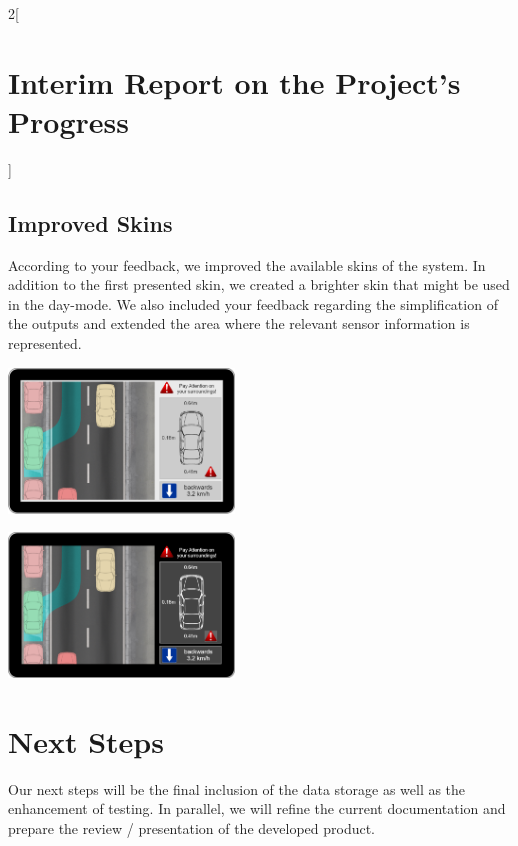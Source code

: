 \documentclass[12pt, a4paper, oneside, british]{report}
\begin{document}
\begin{multicols}{2}[\section{Interim Report on the Project's Progress}]
\subsection{Improved Skins}
According to your feedback, we improved the available skins of the system. In addition to the first presented skin, we created a brighter skin that might be used in the day-mode. We also included your feedback regarding the simplification of the outputs and extended the area where the relevant sensor information is represented.

\vspace{0.5cm}

\includegraphics[width=0.45\textwidth]{brightskin.png}

\vspace{0.5cm}

\includegraphics[width=0.45\textwidth]{darkskin.png}

\section{Next Steps}
Our next steps will be the final inclusion of the data storage as well as the enhancement of testing. In parallel, we will refine the current documentation and prepare the review / presentation of the developed product.


\end{multicols}
\end{document}

